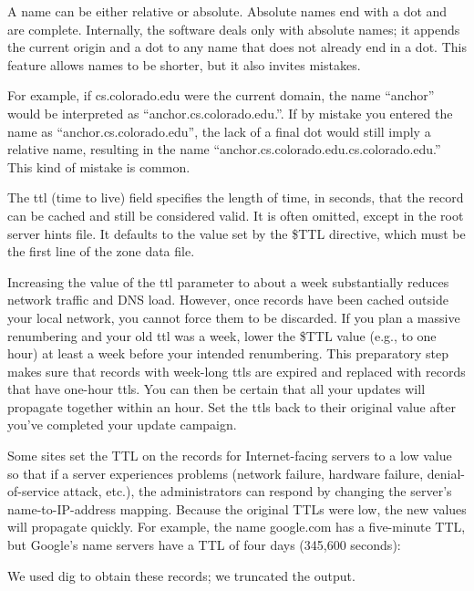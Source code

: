 A name can be either relative or absolute. Absolute names end with a dot
and are complete. Internally, the software deals only with absolute
names; it appends the current origin and a dot to any name that does not
already end in a dot. This feature allows names to be shorter, but it
also invites mistakes.

For example, if cs.colorado.edu were the current domain, the name
``anchor'' would be interpreted as ``anchor.cs.colorado.edu.''. If by
mistake you entered the name as ``anchor.cs.colorado.edu'', the lack of
a final dot would still imply a relative name, resulting in the name
``anchor.cs.colorado.edu.cs.colorado.edu.'' This kind of mistake is
common.

\protect\hypertarget{part0024_split_021.htmlux5cux23_idTextAnchor871}{}{}The{
ttl} (time to live) field specifies the length of time, in seconds, that
the record can be cached and still be considered valid. It is often
omitted, except in the root server hints file. It defaults to the value
set by the {\$TTL} directive, which must be the first line of the zone
data file.

Increasing the value of the {ttl} parameter to about a week
substantially reduces network traffic and DNS load. However, once
records have been cached outside your local network, you cannot force
them to be discarded. If you plan a massive renumbering and your old
{ttl} was a week, lower the {\$TTL} value (e.g., to one hour) at least a
week before your intended renumbering. This preparatory step makes sure
that records with week-long {ttl}s are expired and replaced with records
that have one-hour {ttl}s. You can then be certain that all your updates
will propagate together within an hour. Set the {ttl}s back to their
original value after you've completed your update campaign.

Some sites set the TTL on the records for Internet-facing servers to a
low value so that if a server experiences problems (network failure,
hardware failure,
\protect\hypertarget{part0024_split_021.htmlux5cux23_idIndexMarker2065}{}{}{denial}-of-{service}
attack, etc.), the administrators can respond by changing the server's
name-to-IP-address mapping. Because the original TTLs were low, the new
values will propagate quickly. For example, the name google.com has a
five-minute TTL, but Google's name servers have a TTL of four days
(345,600 seconds):


We used {dig} to obtain these records; we truncated the output.

